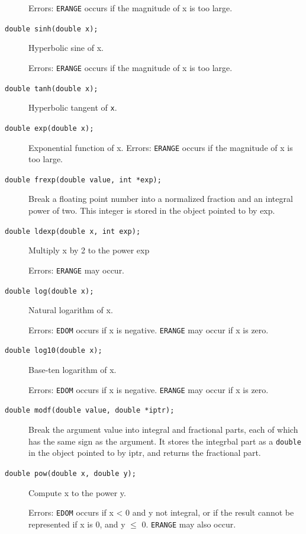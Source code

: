 \begin{description}
    Errors: \texttt{ERANGE} occurs if the magnitude of x is
    too large.

   \item[\texttt{double sinh(double x);}] Hyperbolic sine of x.

    Errors: \texttt{ERANGE} occurs if the magnitude of x is too large.

   \item[\texttt{double tanh(double x);}] Hyperbolic tangent of \texttt{x}.

   \item[\texttt{double exp(double x);}] Exponential function of x.
    Errors: \texttt{ERANGE} occurs if the magnitude of x is
    too large.

   \item[\texttt{double frexp(double value, int *exp);}] Break a floating point number into a normalized fraction
    and an integral power of two. This integer is stored in
    the object pointed to by exp.

   \item[\texttt{double ldexp(double x, int exp);}] Multiply x by 2 to the power exp

    Errors: \texttt{ERANGE} may occur.

   \item[\texttt{double log(double x);}] Natural logarithm of x.

    Errors: \texttt{EDOM} occurs if x is negative.
    \texttt{ERANGE} may occur if x is zero.

   \item[\texttt{double log10(double x);}] Base-ten logarithm of x.

    Errors: \texttt{EDOM} occurs if x is negative.
    \texttt{ERANGE} may occur if x is zero.

   \item[\texttt{double modf(double value, double *iptr);}] Break the argument value into integral and fractional
    parts, each of which has the same sign as the argument.
    It stores the integrbal part as a \texttt{double} in the object
    pointed to by iptr, and returns the fractional part.

   \item[\texttt{double pow(double x, double y);}] Compute x to the power y.

    Errors: \texttt{EDOM} occurs if x < 0 and
    y not integral, or if the result cannot be represented if
    x is 0, and y $\leq$ 0.
    \texttt{ERANGE} may also occur.


\end{description}
